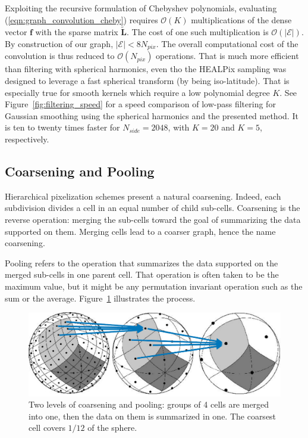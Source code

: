 \documentclass[final,twocolumn,3p,times,authoryear]{elsarticle}
\newcommand{\figref}[1]{Figure~\ref{fig:#1}}
\newcommand{\eqnref}[1]{(\ref{eqn:#1})}
\renewcommand{\b}[1]{{\bm{#1}}}   %
\newcommand{\1}{\b{1}}              %
\newcommand{\0}{\b{0}}              %
\newcommand{\E}{\mathcal{E}}
\renewcommand{\L}{\b{L}}
\newcommand{\tL}{\tilde{\L}}
\newcommand{\f}{\b{f}}
\newcommand{\bO}{\mathcal{O}}
\begin{document}
Exploiting the recursive formulation of Chebyshev polynomials, evaluating \eqnref{graph_convolution_cheby} requires $\bO(K)$ multiplications of the dense vector $\f$ with the sparse matrix $\tL$. The cost of one such multiplication is $\bO(|\E|)$. By construction of our graph, $|\E| < 8 N_{pix}$. The overall computational cost of the convolution is thus reduced to $\bO(N_{pix})$ operations.
That is much more efficient than filtering with spherical harmonics, even tho the HEALPix sampling was designed to leverage a fast spherical transform (by being iso-latitude). That is especially true for smooth kernels which require a low polynomial degree $K$. See \figref{filtering_speed} for a speed comparison of low-pass filtering for Gaussian smoothing using the spherical harmonics and the presented method. It is ten to twenty times faster for $N_{side} = 2048$, with $K=20$ and $K=5$, respectively.

\subsection{Coarsening and Pooling}

Hierarchical pixelization schemes present a natural coarsening. Indeed, each subdivision divides a cell in an equal number of child sub-cells. Coarsening is the reverse operation: merging the sub-cells toward the goal of summarizing the data supported on them. Merging cells lead to a coarser graph, hence the name coarsening.

Pooling refers to the operation that summarizes the data supported on the merged sub-cells in one parent cell. That operation is often taken to be the maximum value, but it might be any permutation invariant operation such as the sum or the average. \figref{pooling} illustrates the process.


\begin{figure}
	\centering
	\includegraphics[width=\linewidth]{figures/pooling.pdf}
	\caption{Two levels of coarsening and pooling: groups of 4 cells are merged into one, then the data on them is summarized in one. The coarsest cell covers $1/12$ of the sphere.}
	\label{fig:pooling}
\end{figure}
\end{document}

